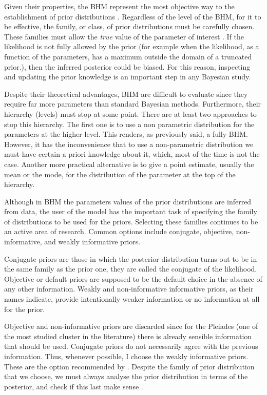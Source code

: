 Given their properties, the BHM represent the most objective way to the establishment of prior distributions \citep{Gelman2006}. Regardless of the level of the BHM, for it to be effective, the family, or class, of prior distributions must be carefully chosen. These families must allow the \emph{true} value of the parameter of interest \citep{Morris1983}. If the likelihood is not fully allowed by the prior (for example when the likelihood, as a function of the parameters, has a maximum outside the domain of a truncated prior.), then the inferred posterior could be biased. For this reason, inspecting and updating the prior knowledge is an important step in any Bayesian study.

Despite their theoretical advantages, BHM are difficult to evaluate since they require far more parameters than standard Bayesian methods.
Furthermore, their hierarchy (levels) must stop at some point. There are at least two approaches to stop this hierarchy. The first one is to use a non parametric distribution for the parameters at the higher level. This renders, as previously said, a fully-BHM. However, it has the inconvenience that to use a non-parametric distribution we must have certain a priori knowledge about it, which, most of the time is not the case. Another more practical alternative is to give a point estimate, usually the mean or the mode, for the distribution of the parameter at the top of the hierarchy.  

Although in BHM the parameters values of the prior distributions are inferred from data, the user of the model has the important task of specifying the family of distributions to be used for the priors. Selecting these families continues to be an active area of research. Common options include conjugate, objective, non-informative, and weakly informative priors. 

Conjugate priors are those in which the posterior distribution turns out to be in the same family as the prior one, they are called the conjugate of the likelihood. Objective or default priors are supposed to be the default choice in the absence of any other information. Weakly and non-informative informative priors, as their names indicate, provide intentionally weaker information or no information at all for the prior. 

Objective and non-informative priors are discarded since for the Pleiades (one of the most studied cluster in the literature) there is already sensible information that  should be used. Conjugate priors do not necessarily agree with the previous information. Thus, whenever possible, I choose the weakly informative priors. These are the option recommended by \citet{Gelman2006,Huang2013,Chung2015}. Despite the family of prior distribution that we choose, we must always analyse the prior distribution in terms of the posterior, and check if this last make sense \cite[][ Chap. 6]{Gelman2006,Gelman2013}.
